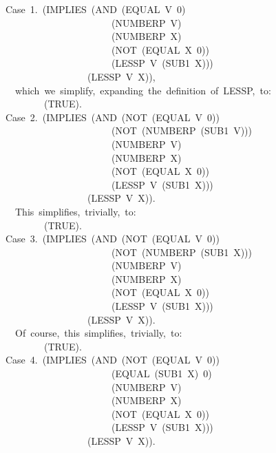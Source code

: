 \documentclass[11pt]{book}
\newenvironment{pubasis}{\begin{flushleft}\ttfamily\small}{\normalsize\rmfamily\end{flushleft}}
\begin{document}
\begin{pubasis}
~~Case~1.~(IMPLIES~(AND~(EQUAL~V~0)\\
~~~~~~~~~~~~~~~~~~~~~~~~(NUMBERP~V)\\
~~~~~~~~~~~~~~~~~~~~~~~~(NUMBERP~X)\\
~~~~~~~~~~~~~~~~~~~~~~~~(NOT~(EQUAL~X~0))\\
~~~~~~~~~~~~~~~~~~~~~~~~(LESSP~V~(SUB1~X)))\\
~~~~~~~~~~~~~~~~~~~(LESSP~V~X)),\\

~~~~which~we~simplify,~expanding~the~definition~of~LESSP,~to:\\

~~~~~~~~~~(TRUE).\\

~~Case~2.~(IMPLIES~(AND~(NOT~(EQUAL~V~0))\\
~~~~~~~~~~~~~~~~~~~~~~~~(NOT~(NUMBERP~(SUB1~V)))\\
~~~~~~~~~~~~~~~~~~~~~~~~(NUMBERP~V)\\
~~~~~~~~~~~~~~~~~~~~~~~~(NUMBERP~X)\\
~~~~~~~~~~~~~~~~~~~~~~~~(NOT~(EQUAL~X~0))\\
~~~~~~~~~~~~~~~~~~~~~~~~(LESSP~V~(SUB1~X)))\\
~~~~~~~~~~~~~~~~~~~(LESSP~V~X)).\\

~~~~This~simplifies,~trivially,~to:\\

~~~~~~~~~~(TRUE).\\

~~Case~3.~(IMPLIES~(AND~(NOT~(EQUAL~V~0))\\
~~~~~~~~~~~~~~~~~~~~~~~~(NOT~(NUMBERP~(SUB1~X)))\\
~~~~~~~~~~~~~~~~~~~~~~~~(NUMBERP~V)\\
~~~~~~~~~~~~~~~~~~~~~~~~(NUMBERP~X)\\
~~~~~~~~~~~~~~~~~~~~~~~~(NOT~(EQUAL~X~0))\\
~~~~~~~~~~~~~~~~~~~~~~~~(LESSP~V~(SUB1~X)))\\
~~~~~~~~~~~~~~~~~~~(LESSP~V~X)).\\

~~~~Of~course,~this~simplifies,~trivially,~to:\\

~~~~~~~~~~(TRUE).\\

~~Case~4.~(IMPLIES~(AND~(NOT~(EQUAL~V~0))\\
~~~~~~~~~~~~~~~~~~~~~~~~(EQUAL~(SUB1~X)~0)\\
~~~~~~~~~~~~~~~~~~~~~~~~(NUMBERP~V)\\
~~~~~~~~~~~~~~~~~~~~~~~~(NUMBERP~X)\\
~~~~~~~~~~~~~~~~~~~~~~~~(NOT~(EQUAL~X~0))\\
~~~~~~~~~~~~~~~~~~~~~~~~(LESSP~V~(SUB1~X)))\\
~~~~~~~~~~~~~~~~~~~(LESSP~V~X)).\\


\end{pubasis}
\end{document}
